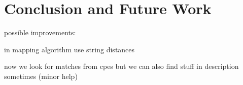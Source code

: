 \chapter{Conclusion and Future Work}
\label{chap7-conclusion-and-future-work}
\thispagestyle{empty}

possible improvements:

in mapping algorithm use string distances

now we look for matches from cpes but we can also find stuff in description sometimes (minor help)




